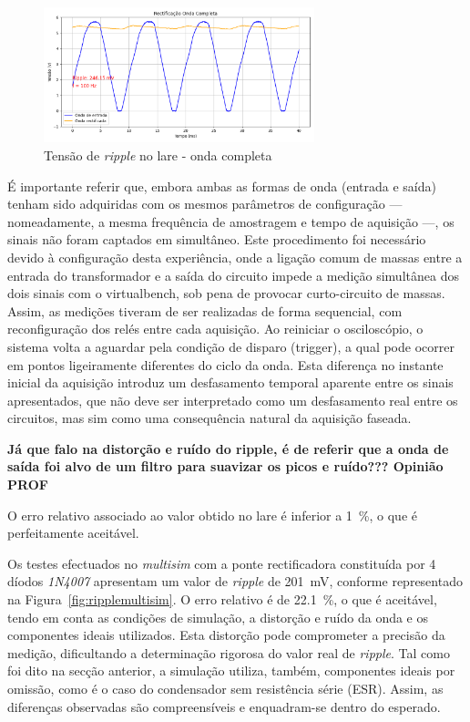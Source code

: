 \begin{figure}[hbtp]
	\centering
	\includegraphics[width=0.7\textwidth]{figures/onda-completa.png}
	\caption{Tensão de \textit{ripple} no \acrshort{lare} - onda completa}
	\label{fig:ripplelareonda}
\end{figure}

É importante referir que, embora ambas as formas de onda (entrada e saída) tenham sido adquiridas com os mesmos parâmetros de configuração — nomeadamente, a mesma frequência de amostragem e tempo de aquisição —, os sinais não foram captados em simultâneo. Este procedimento foi necessário devido à configuração desta experiência, onde a ligação comum de massas entre a entrada do transformador e a saída do circuito impede a medição simultânea dos dois sinais com o \acrshort{virtualbench}, sob pena de provocar curto-circuito de massas. Assim, as medições tiveram de ser realizadas de forma sequencial, com reconfiguração dos relés entre cada aquisição. Ao reiniciar o osciloscópio, o sistema volta a aguardar pela condição de disparo (trigger), a qual pode ocorrer em pontos ligeiramente diferentes do ciclo da onda. Esta diferença no instante inicial da aquisição introduz um desfasamento temporal aparente entre os sinais apresentados, que não deve ser interpretado como um desfasamento real entre os circuitos, mas sim como uma consequência natural da aquisição faseada.

\textbf{Já que falo na distorção e ruído do ripple, é de referir que a onda de saída foi alvo de um filtro para suavizar os picos e ruído??? Opinião PROF}

O erro relativo associado ao valor obtido no \acrshort{lare} é inferior a \SI{1}{\percent}, o que é perfeitamente aceitável.

Os testes efectuados no \textit{multisim} com a ponte rectificadora constituída por 4 díodos \textit{1N4007} apresentam um valor de \textit{ripple} de \SI{201}{\milli\volt}, conforme representado na Figura~\ref{fig:ripplemultisim}. O erro relativo é de \SI{22.1}{\percent}, o que é aceitável, tendo em conta as condições de simulação, a distorção e ruído da onda e os componentes ideais utilizados. Esta distorção pode comprometer a precisão da medição, dificultando a determinação rigorosa do valor real de \textit{ripple}. Tal como foi dito na secção anterior, a simulação utiliza, também, componentes ideais por omissão, como é o caso do condensador sem resistência série (ESR). Assim, as diferenças observadas são compreensíveis e enquadram-se dentro do esperado.

